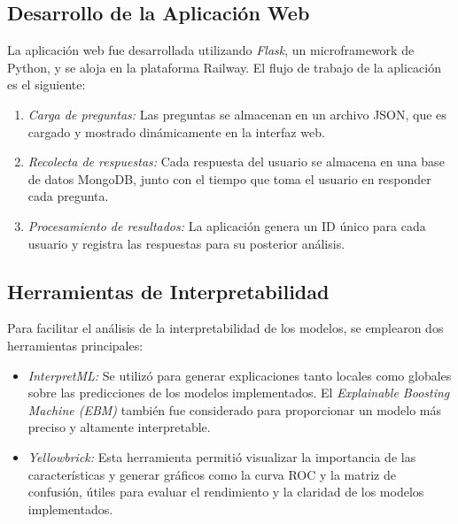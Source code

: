 \subsection{Desarrollo de la Aplicación Web}
La aplicación web fue desarrollada utilizando \textit{Flask}, un microframework de Python, y se aloja en la plataforma Railway. El flujo de trabajo de la aplicación es el siguiente:

\begin{enumerate}
    \item \textit{Carga de preguntas:} Las preguntas se almacenan en un archivo JSON, que es cargado y mostrado dinámicamente en la interfaz web.
    \item \textit{Recolecta de respuestas:} Cada respuesta del usuario se almacena en una base de datos MongoDB, junto con el tiempo que toma el usuario en responder cada pregunta.
    \item \textit{Procesamiento de resultados:} La aplicación genera un ID único para cada usuario y registra las respuestas para su posterior análisis.
\end{enumerate}

\subsection{Herramientas de Interpretabilidad}
Para facilitar el análisis de la interpretabilidad de los modelos, se emplearon dos herramientas principales:

\begin{itemize}
    \item \textit{InterpretML:} Se utilizó para generar explicaciones tanto locales como globales sobre las predicciones de los modelos implementados. El \textit{Explainable Boosting Machine (EBM)} también fue considerado para proporcionar un modelo más preciso y altamente interpretable.
    \item \textit{Yellowbrick:} Esta herramienta permitió visualizar la importancia de las características y generar gráficos como la curva ROC y la matriz de confusión, útiles para evaluar el rendimiento y la claridad de los modelos implementados.
\end{itemize}
